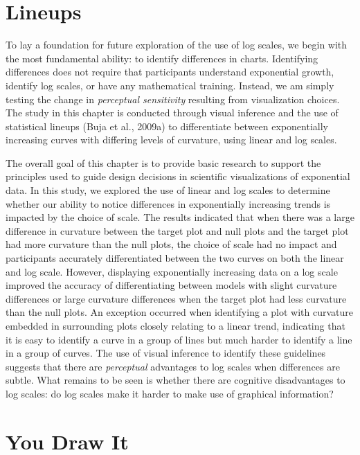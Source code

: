 \documentclass[print]{nuthesis}
\begin{document}
\hypertarget{lineups-1}{%
\section{Lineups}\label{lineups-1}}

To lay a foundation for future exploration of the use of log scales, we begin with the most fundamental ability: to identify differences in charts. Identifying differences does not require that participants understand exponential growth, identify log scales, or have any mathematical training.
Instead, we am simply testing the change in \emph{perceptual sensitivity} resulting from visualization choices.
The study in this chapter is conducted through visual inference and the use of statistical lineups (Buja et al., 2009a) to differentiate between exponentially increasing curves with differing levels of curvature, using linear and log scales.

The overall goal of this chapter is to provide basic research to support the principles used to guide design decisions in scientific visualizations of exponential data.
In this study, we explored the use of linear and log scales to determine whether our ability to notice differences in exponentially increasing trends is impacted by the choice of scale.
The results indicated that when there was a large difference in curvature between the target plot and null plots and the target plot had more curvature than the null plots, the choice of scale had no impact and participants accurately differentiated between the two curves on both the linear and log scale.
However, displaying exponentially increasing data on a log scale improved the accuracy of differentiating between models with slight curvature differences or large curvature differences when the target plot had less curvature than the null plots.
An exception occurred when identifying a plot with curvature embedded in surrounding plots closely relating to a linear trend, indicating that it is easy to identify a curve in a group of lines but much harder to identify a line in a group of curves.
The use of visual inference to identify these guidelines suggests that there are \emph{perceptual} advantages to log scales when differences are subtle.
What remains to be seen is whether there are cognitive disadvantages to log scales: do log scales make it harder to make use of graphical information?

\hypertarget{you-draw-it}{%
\section{You Draw It}\label{you-draw-it}}
\end{document}

